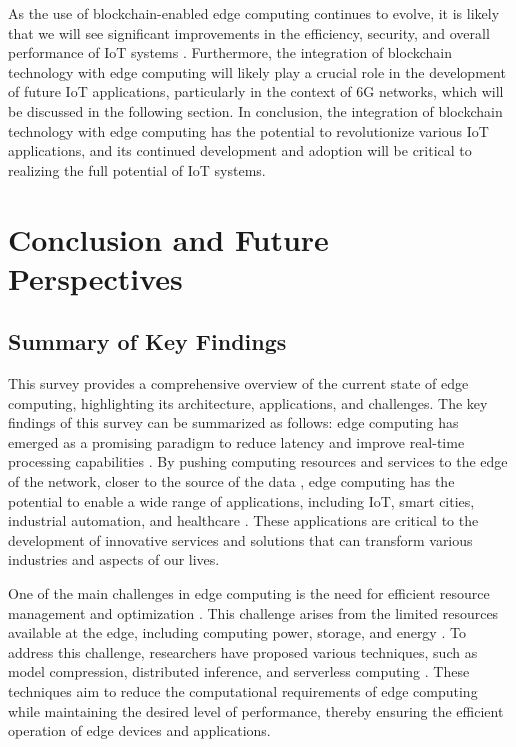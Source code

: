 \documentclass[11pt]{article}
\begin{document}
As the use of blockchain-enabled edge computing continues to evolve, it is likely that we will see significant improvements in the efficiency, security, and overall performance of IoT systems \cite{ref23}. Furthermore, the integration of blockchain technology with edge computing will likely play a crucial role in the development of future IoT applications, particularly in the context of 6G networks, which will be discussed in the following section. In conclusion, the integration of blockchain technology with edge computing has the potential to revolutionize various IoT applications, and its continued development and adoption will be critical to realizing the full potential of IoT systems.

\section{Conclusion and Future Perspectives}

\subsection{Summary of Key Findings}

This survey provides a comprehensive overview of the current state of edge computing, highlighting its architecture, applications, and challenges. The key findings of this survey can be summarized as follows: edge computing has emerged as a promising paradigm to reduce latency and improve real-time processing capabilities \cite{ref2}. By pushing computing resources and services to the edge of the network, closer to the source of the data \cite{ref53}, edge computing has the potential to enable a wide range of applications, including IoT, smart cities, industrial automation, and healthcare \cite{ref12}. These applications are critical to the development of innovative services and solutions that can transform various industries and aspects of our lives.

One of the main challenges in edge computing is the need for efficient resource management and optimization \cite{ref151}. This challenge arises from the limited resources available at the edge, including computing power, storage, and energy \cite{ref152}. To address this challenge, researchers have proposed various techniques, such as model compression, distributed inference, and serverless computing \cite{ref96}. These techniques aim to reduce the computational requirements of edge computing while maintaining the desired level of performance, thereby ensuring the efficient operation of edge devices and applications.
\end{document}
